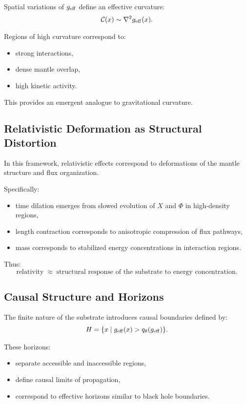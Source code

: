 \documentclass[11pt]{article}
\begin{document}
Spatial variations of $g_{\rm eff}$ define an effective curvature:
\begin{equation}
\mathcal{C}(x) \sim \nabla^2 g_{\rm eff}(x).
\end{equation}

Regions of high curvature correspond to:
\begin{itemize}
\item strong interactions,
\item dense mantle overlap,
\item high kinetic activity.
\end{itemize}

This provides an emergent analogue to gravitational curvature.

\subsection{Relativistic Deformation as Structural Distortion}

In this framework, relativistic effects correspond to deformations of the mantle structure and flux organization.

Specifically:
\begin{itemize}
\item time dilation emerges from slowed evolution of $X$ and $\Phi$ in high-density regions,
\item length contraction corresponds to anisotropic compression of flux pathways,
\item mass corresponds to stabilized energy concentrations in interaction regions.
\end{itemize}

Thus:
\begin{equation}
\text{relativity} \;\approx\; \text{structural response of the substrate to energy concentration}.
\end{equation}

\subsection{Causal Structure and Horizons}

The finite nature of the substrate introduces causal boundaries defined by:
\begin{equation}
H = \{ x \mid g_{\rm eff}(x) > q_\theta(g_{\rm eff}) \}.
\end{equation}

These horizons:
\begin{itemize}
\item separate accessible and inaccessible regions,
\item define causal limits of propagation,
\item correspond to effective horizons similar to black hole boundaries.
\end{itemize}
\end{document}
